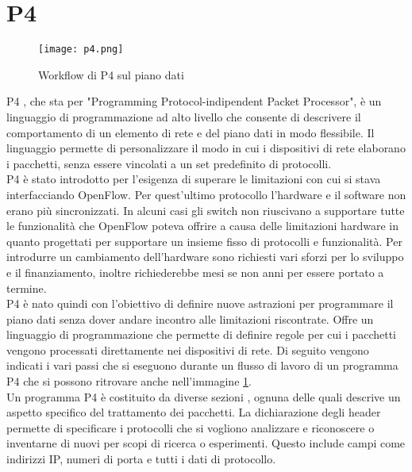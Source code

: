\section{P4}
\begin{figure}[h]
    \centering
   \texttt{[image: p4.png]}
    \caption{Workflow di P4 sul piano dati \cite{p4Article}}
    \label{fig:p4}
\end{figure}
P4 \cite{p4}, che sta per "Programming Protocol-indipendent Packet Processor",  è un linguaggio di programmazione ad alto livello che consente di descrivere il comportamento di un elemento di rete e del piano dati in modo flessibile.
Il linguaggio permette di personalizzare il modo in cui i dispositivi di rete elaborano i pacchetti, senza essere vincolati a un set predefinito di protocolli.
\\P4 è stato introdotto per l'esigenza di superare le limitazioni con cui si stava interfacciando OpenFlow.
Per quest'ultimo protocollo l'hardware e il software non erano più sincronizzati. In alcuni casi 
gli switch non riuscivano a supportare tutte le funzionalità che OpenFlow poteva offrire a causa delle limitazioni hardware in quanto progettati per supportare un insieme fisso di protocolli e funzionalità. 
Per introdurre un cambiamento dell'hardware sono richiesti vari sforzi per lo sviluppo e il finanziamento, inoltre richiederebbe mesi se non anni per essere portato a termine.
\\P4 è nato quindi con l'obiettivo di definire nuove astrazioni per programmare il piano dati senza dover andare incontro alle limitazioni riscontrate.
Offre un linguaggio di programmazione che permette di definire regole per cui i pacchetti vengono processati direttamente nei dispositivi di rete.
Di seguito vengono indicati i vari passi che si eseguono durante un flusso di lavoro di un programma P4 che si possono ritrovare anche nell'immagine \ref{fig:p4}.
\\Un programma P4 è costituito da diverse sezioni \cite{p4Article}, ognuna delle quali descrive un aspetto specifico del trattamento dei pacchetti.
La dichiarazione degli header permette di specificare i protocolli che si vogliono analizzare e riconoscere o inventarne di nuovi per scopi di ricerca o esperimenti.
Questo include campi come indirizzi IP, numeri di porta e tutti i dati di protocollo.
